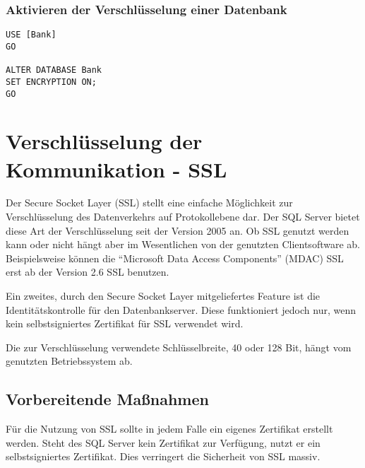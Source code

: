        \subsubsection{Aktivieren der Verschlüsselung einer Datenbank}
          \begin{lstlisting}[language=ms_sql,caption={Aktivieren
          der Verschlüsselung},label=sql19_30]
USE [Bank]
GO

ALTER DATABASE Bank
SET ENCRYPTION ON;
GO
          \end{lstlisting}
          \begin{literaturinternet}
            \item \cite{bb934049}
          \end{literaturinternet}
    \section{Verschlüsselung der Kommunikation - SSL}
      Der Secure Socket Layer (SSL) stellt eine einfache Möglichkeit zur
      Verschlüsselung des Datenverkehrs auf Protokollebene dar. Der SQL Server
      bietet diese Art der Verschlüsselung seit der Version 2005 an. Ob SSL
      genutzt werden kann oder nicht hängt aber im Wesentlichen von der
      genutzten Clientsoftware ab. Beispielsweise können die \enquote{Microsoft
      Data Access Components} (MDAC) SSL erst ab der Version 2.6 SSL benutzen.
      
      Ein zweites, durch den Secure Socket Layer mitgeliefertes Feature ist die
      Identitätskontrolle für den Datenbankserver. Diese funktioniert jedoch
      nur, wenn kein selbstsigniertes Zertifikat für SSL verwendet wird.
      \begin{merke}
        Die zur Verschlüsselung verwendete Schlüsselbreite, 40 oder 128 Bit,
        hängt vom genutzten Betriebssystem ab.
      \end{merke}
      \subsection{Vorbereitende Maßnahmen}
        \begin{merke}
          Für die Nutzung von SSL sollte in jedem Falle ein eigenes Zertifikat
          erstellt werden. Steht des SQL Server kein Zertifikat zur Verfügung,
          nutzt er ein selbstsigniertes Zertifikat. Dies verringert die
          Sicherheit von SSL massiv.
        \end{merke}

